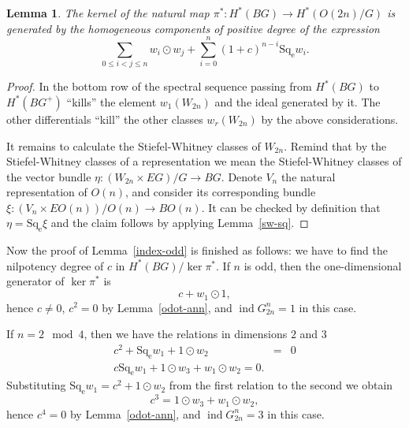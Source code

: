 \documentclass[12pt,a4paper]{amsart}
\newtheorem{lem}{Lemma}
\theoremstyle{definition}
\theoremstyle{remark}
\begin{document}
\begin{lem}
\label{ideal-ind}
The kernel of the natural map $\pi^* : H^*(BG)\to H^*(O(2n)/G)$ is generated by the homogeneous components of positive degree of the expression
$$
\sum_{0\le i < j \le n} w_i\odot w_j + \sum_{i=0}^n (1+c)^{n-i} \operatorname{Sq_e} w_i.
$$
\end{lem}

\begin{proof}
In the bottom row of the spectral sequence passing from $H^*(BG)$ to $H^*(BG^+)$ ``kills'' the element $w_1(W_{2n})$ and the ideal generated by it. The other differentials ``kill'' the other classes $w_r(W_{2n})$ by the above considerations.

It remains to calculate the Stiefel-Whitney classes of $W_{2n}$. Remind that by the Stiefel-Whitney classes of a representation we mean the Stiefel-Whitney classes of the vector bundle $\eta : (W_{2n}\times EG)/G\to BG$. Denote $V_n$ the natural representation of $O(n)$, and consider its corresponding bundle $\xi : (V_n\times EO(n))/O(n) \to BO(n)$. It can be checked by definition that $\eta=\operatorname{Sq_e}\xi$ and the claim follows by applying Lemma~\ref{sw-sq}.
\end{proof}

Now the proof of Lemma~\ref{index-odd} is finished as follows: we have to find the nilpotency degree of $c$ in $H^*(BG)/\ker\pi^*$. If $n$ is odd, then the one-dimensional generator of $\ker \pi^*$ is 
$$
c + w_1\odot 1,
$$
hence $c\not=0$, $c^2=0$ by Lemma~\ref{odot-ann}, and $\operatorname{ind} G_{2n}^n=1$ in this case. 

If $n=2\mod 4$, then we have the relations in dimensions $2$ and $3$
\begin{eqnarray*}
c^2+\operatorname{Sq_e} w_1 + 1\odot w_2 &=& 0\\
c\operatorname{Sq_e} w_1 + 1\odot w_3 + w_1\odot w_2 = 0.
\end{eqnarray*}
Substituting $\operatorname{Sq_e} w_1 = c^2 + 1\odot w_2$ from the first relation to the second we obtain
$$
c^3 = 1\odot w_3 + w_1 \odot w_2,
$$
hence $c^4 = 0$ by Lemma~\ref{odot-ann}, and $\operatorname{ind} G_{2n}^n=3$ in this case.
\end{document}
